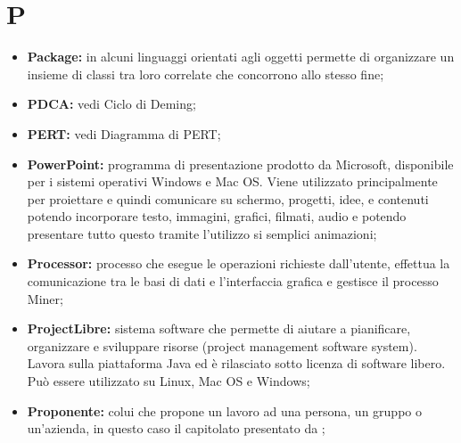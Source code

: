 %


\section*{P} %
\label{sec:p}
	\begin{itemize}
		\item \textbf{Package:} in alcuni linguaggi orientati agli oggetti permette di organizzare un insieme di classi tra loro correlate che concorrono allo stesso fine;
		\item \textbf{PDCA:} vedi Ciclo di Deming;		
		\item \textbf{PERT:} vedi Diagramma di PERT;		
		\item \textbf{PowerPoint:} programma di presentazione prodotto da Microsoft, disponibile per i sistemi operativi Windows e Mac OS. Viene utilizzato principalmente per proiettare e quindi comunicare su schermo, progetti, idee, e contenuti potendo incorporare testo, immagini, grafici, filmati, audio e potendo presentare tutto questo tramite l'utilizzo si semplici animazioni;
		\item \textbf{Processor:} processo che esegue le operazioni richieste dall'utente, effettua la comunicazione tra le basi di dati e l'interfaccia grafica e gestisce il processo Miner;
		\item \textbf{ProjectLibre:} sistema software che permette di aiutare a pianificare, organizzare e sviluppare risorse (project management software system). Lavora sulla piattaforma Java ed è rilasciato sotto licenza di software libero. Può essere utilizzato su Linux, Mac OS e Windows;		
		\item \textbf{Proponente:} colui che propone un lavoro ad una persona, un gruppo o un'azienda, in questo caso il capitolato presentato da \proposerName;
	\end{itemize}
\pagebreak

